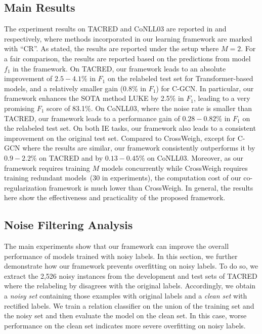 \documentclass[11pt]{article}
\begin{document}
\subsection{Main Results}\label{ssec:main_results}
The experiment results on TACRED and CoNLL03 are reported in  and  respectively, where methods incorporated in our learning framework are marked with ``CR''.
As stated, the results are reported under the setup where $M=2$.
For a fair comparison, the results are reported based on the predictions from model $f_1$ in the framework.
On TACRED, our framework leads to an absolute improvement of $2.5-4.1\%$ in
$F_1$ on the relabeled test set for Transformer-based models, and a relatively smaller gain (0.8\% in $F_1$) for C-GCN.
In particular, our framework enhances the SOTA method LUKE by 2.5\% in $F_1$, leading to a very promising $F_1$ score of 83.1\%.
On CoNLL03, where the noise rate is smaller than TACRED, our framework leads to a performance gain of $0.28-0.82\%$ in $F_1$ on the relabeled test set.
On both IE tasks, our framework also leads to a consistent improvement on the original test set.
Compared to CrossWeigh, except for C-GCN where the results are similar, our framework consistently outperforms it by $0.9-2.2\%$ on TACRED and by $0.13-0.45\%$ on CoNLL03.
Moreover, as our framework requires training $M$ models concurrently while CrossWeigh requires training redundant models~(30 in experiments), the computation cost of our co-regularization framework is much lower than CrossWeigh.
In general, the results here show the effectiveness and practicality of the proposed framework.



\subsection{Noise Filtering Analysis}\label{ssec:noise_filtering}
The main experiments show that our framework can improve the overall performance of models trained with noisy labels.
In this section, we further demonstrate how our framework prevents overfitting on noisy labels.
To do so, we extract the 2,526 noisy instances from the development and test sets of TACRED where the relabeling by \citet{Alt2020TACREDRA} disagrees with the original labels.
Accordingly, we obtain a \emph{noisy set} containing those examples with original labels and a \emph{clean set} with rectified labels. 
We train a relation classifier on the union of the training set and the noisy set and then evaluate the model on the clean set.
In this case, worse performance on the clean set indicates more severe overfitting on noisy labels.
\end{document}
